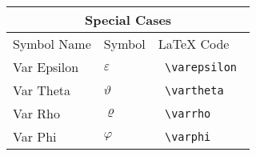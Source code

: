 \documentclass[12pt]{article}
\begin{document}
\begin{tabular}{ |p{4cm}|p{4cm}|p{4cm}|  }
    \hline
    \multicolumn{3}{|c|}{Special Cases} \\
    \hline
    Symbol Name & Symbol & LaTeX Code \\
    \hline
    Var Epsilon & $\varepsilon$ & \verb= \varepsilon =\\
    Var Theta & $\vartheta$ & \verb= \vartheta =\\
    Var Rho & $\varrho$ & \verb= \varrho =\\
    Var Phi & $\varphi$ & \verb= \varphi =\\
    \hline
\end{tabular} 
\end{document}
